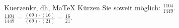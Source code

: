 \begin{MAufgabe}{Kuerzen}{kr, dh, MaTeX}
K\"urzen Sie soweit m\"oglich: $\frac{1104}{1449}$.\\ 
\ifLsg\MLoesung
\quad $\frac{1104}{1449}=\frac{(69)\cdot(16)}{(69)\cdot(21)}=\frac{16}{21}$.\else\relax\fi
 \end{MAufgabe}